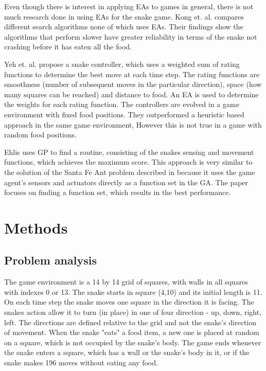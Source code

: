 \documentclass[12pt,a4paper]{article}
\begin{document}
	Even though there is interest in applying EAs to games in general, there is not much research done in using EAs for the snake game. Kong et. al. \cite{kong_automated_nodate} compares different search algorithms none of which uses EAs. Their findings show the algorithms that perform slower have greater reliability in terms of the snake not crashing before it has eaten all the food. 
	
	Yeh et. al. \cite{yeh_snake_2016} propose a snake controller, which uses a weighted sum of rating functions to determine the best move at each time step. The rating functions are smoothness (number of subsequent moves in the particular direction), space (how many squares can be reached) and distance to food. An EA is used to determine the weights for each rating function. The controllers are evolved in a game environment with fixed food positions. They outperformed a heuristic based approach in the same game environment, However this is not true in a game with random food positions.
	
	Ehlis \cite{ehlis_application_2000} uses GP to find a routine, consisting of the snakes sensing and movement functions, which achieves the maximum score. This approach is very similar to the solution of the Santa Fe Ant problem described in \cite{koza_genetic_1992} because it uses the game agent's sensors and actuators directly as a function set in the GA. The paper focuses on finding a function set, which results in the best performance.
	

	\section{Methods} \label{methods}
	
	\subsection{Problem analysis}
	The game environment is a 14 by 14 grid of squares, with walls in all squares with indexes 0 or 13. The snake starts in square (4,10) and its initial length is 11. On each time step the snake moves one square in the direction it is facing. The snakes action allow it to turn (in place) in one of four direction - up, down, right, left. The directions are defined relative to the grid and not the snake's direction of movement. When the snake "eats" a food item, a new one is placed at random on a square, which is not occupied by the snake's body. The game ends whenever the snake enters a square, which has a wall or the snake's body in it, or if the snake makes 196 moves without eating any food.  
	
\end{document}
